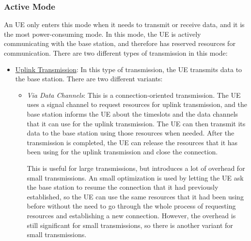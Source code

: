 \subsubsection{Active Mode}
    An UE only enters this mode when it needs to transmit or receive data, and it is the most power-consuming mode. In this mode, the UE is actively communicating with the base station, and therefore has reserved resources for communication. There are two different types of transmission in this mode:
    \begin{itemize}
        \item \ul{Uplink Transmission}: In this type of transmission, the UE transmits data to the base station. There are two different variants:
        \begin{itemize}
            \item \emph{Via Data Channels}: This is a connection-oriented transmission. The UE uses a signal channel to request resources for uplink transmission, and the base station informs the UE about the timeslots and the data channels that it can use for the uplink transmission. The UE can then transmit its data to the base station using those resources when needed. After the transmission is completed, the UE can release the resources that it has been using for the uplink transmission and close the connection.
            
            This is useful for large transmissions, but introduces a lot of overhead for small transmissions. An small optimization is used by letting the UE ask the base station to resume the connection that it had previously established, so the UE can use the same resources that it had been using before without the need to go through the whole process of requesting resources and establishing a new connection. However, the overhead is still significant for small transmissions, so there is another variant for small transmissions.
        

\end{itemize}
\end{itemize}

